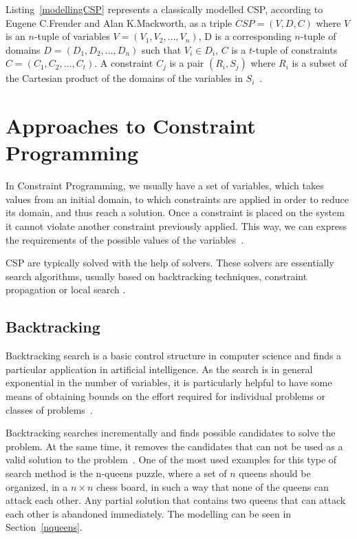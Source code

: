 Listing~\ref{modellingCSP} represents a classically modelled \ac{CSP}, according to Eugene C.Freuder and Alan K.Mackworth, as a triple $CSP = (V, D, C)$ where $V$ is an $n$-tuple of variables $V=(V_1,V_2,\ldots,V_n)$, D is a corresponding $n$-tuple of domains $D=(D_1,D_2,\ldots,D_n)$ such that $V_i \in D_i$, $C$ is a $t$-tuple of constraints $C=(C_1,C_2,\ldots,C_t)$. A constraint $C_j$ is a pair $(R_i,S_j)$ where $R_i$ is a subset of the Cartesian product of the domains of the variables in $S_i$~\cite{rossi2006handbook}.

\section{Approaches to Constraint Programming}

In Constraint Programming, we usually have a set of variables, which takes values from an initial domain, to which constraints are applied in order to reduce its domain, and thus reach a solution. Once a constraint is placed on the system it cannot violate another constraint previously applied. This way, we can express the requirements of the possible values of the variables~\cite{Pearson1997}.

\ac{CSP} are typically solved with the help of solvers. These solvers are essentially search algorithms, usually based on backtracking techniques\cite{Knuth1997}, constraint propagation \cite{Lecoutre2010} or local search \cite{Dechter2003}. 

\subsection{Backtracking}

Backtracking search is a basic control structure in computer science and finds a particular application in artificial intelligence. As the search is in general exponential in the number of variables, it is particularly helpful to have some means of obtaining bounds on the effort required for individual problems or classes of problems~\cite{freuder1985sufficient}. 

Backtracking searches incrementally and finds possible candidates to solve the problem. At the same time, it removes the candidates that can not be used as a valid solution to the problem~\cite{Knuth1997}. One of the most used examples for this type of search method is the n-queens puzzle, where a set of $n$ queens should be organized, in a $n \times n$ chess board, in such a way that none of the queens can attack each other. Any partial solution that contains two queens that can attack each other is abandoned immediately. The modelling can be seen in Section~\ref{nqueens}.

